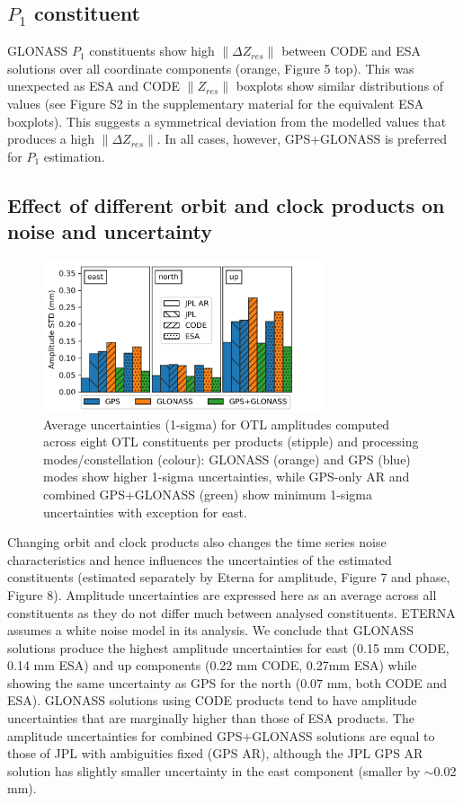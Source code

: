 \documentclass[se, manuscript]{copernicus}
\begin{document}
\subsection{$P_1$ constituent}
GLONASS $P_1$ constituents show high $\|\Delta Z_{res}\|$ between CODE and ESA solutions over all coordinate components (orange, Figure 5 top). This was unexpected as ESA and CODE $\|Z_{res}\|$ boxplots show similar distributions of values (see Figure S2 in the supplementary material for the equivalent ESA boxplots). This suggests a symmetrical deviation from the modelled values that produces a high $\|\Delta Z_{res}\|$. In all cases, however, GPS+GLONASS is preferred for $P_1$ estimation.

\subsection{Effect of different orbit and clock products on noise and uncertainty}

\begin{figure}[t]
\includegraphics[width=8.3cm]{fig07.png}
\caption{Average uncertainties (1-sigma) for OTL amplitudes computed across eight OTL constituents per products (stipple) and processing modes/constellation (colour): GLONASS (orange) and GPS (blue) modes show higher 1-sigma uncertainties, while GPS-only AR and combined GPS+GLONASS (green) show minimum 1-sigma uncertainties with exception for east.}
\end{figure}

Changing orbit and clock products also changes the time series noise characteristics and hence influences the uncertainties of the estimated constituents (estimated separately by Eterna for amplitude, Figure 7 and phase, Figure 8). Amplitude uncertainties are expressed here as an average across all constituents as they do not differ much between analysed constituents. ETERNA assumes a white noise model in its analysis. We conclude that GLONASS solutions produce the highest amplitude uncertainties for east (0.15 mm CODE, 0.14 mm ESA) and up components (0.22 mm CODE, 0.27mm ESA) while showing the same uncertainty as GPS for the north (0.07 mm, both CODE and ESA). GLONASS solutions using CODE products tend to have amplitude uncertainties that are marginally higher than those of ESA products. The amplitude uncertainties for combined GPS+GLONASS solutions are equal to those of JPL with ambiguities fixed (GPS AR), although the JPL GPS AR solution has slightly smaller uncertainty in the east component (smaller by $\sim$0.02 mm).
\end{document}
